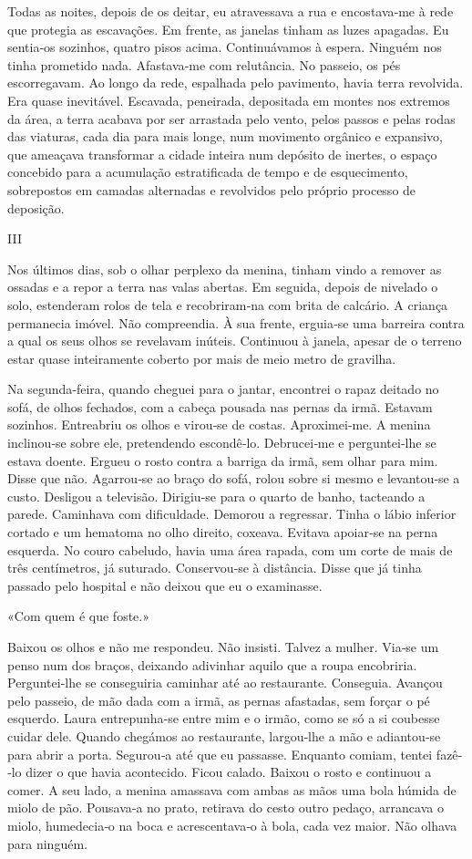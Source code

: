 Todas as noites, depois de os deitar, eu atravessava a rua e
encostava­‑me à rede que protegia as escavações. Em frente, as janelas
tinham as luzes apagadas. Eu sentia­‑os sozinhos, quatro pisos acima.
Continuávamos à espera. Ninguém nos tinha prometido nada. Afastava­‑me
com relutância. No passeio, os pés escorregavam. Ao longo da rede,
espalhada pelo pavimento, havia terra revolvida. Era quase inevitável.
Escavada, peneirada, depositada em montes nos extremos da área, a terra
acabava por ser arrastada pelo vento, pelos passos e pelas rodas das
viaturas, cada dia para mais longe, num movimento orgânico e expansivo,
que ameaçava transformar a cidade inteira num depósito de inertes, o
espaço concebido para a acumulação estratificada de tempo e de
esquecimento, sobrepostos em camadas alternadas e revolvidos pelo
próprio processo de deposição.

III

Nos últimos dias, sob o olhar perplexo da menina, tinham vindo a remover
as ossadas e a repor a terra nas valas abertas. Em seguida, depois de
nivelado o solo, estenderam rolos de tela e recobriram­‑na com brita de
calcário. A criança permanecia imóvel. Não compreendia. À sua frente,
erguia­‑se uma barreira contra a qual os seus olhos se revelavam
inúteis. Continuou à janela, apesar de o terreno estar quase
inteiramente coberto por mais de meio metro de gravilha.

Na segunda­‑feira, quando cheguei para o jantar, encontrei o rapaz
deitado no sofá, de olhos fechados, com a cabeça pousada nas pernas da
irmã. Estavam sozinhos. Entreabriu os olhos e virou­‑se de costas.
Aproximei­‑me. A menina inclinou­‑se sobre ele, pretendendo escondê­‑lo.
Debrucei­‑me e perguntei­‑lhe se estava doente. Ergueu o rosto contra a
barriga da irmã, sem olhar para mim. Disse que não. Agarrou­‑se ao braço
do sofá, rolou sobre si mesmo e levantou­‑se a custo. Desligou a
televisão. Dirigiu­‑se para o quarto de banho, tacteando a parede.
Caminhava com dificuldade. Demorou a regressar. Tinha o lábio inferior
cortado e um hematoma no olho direito, coxeava. Evitava apoiar­‑se na
perna esquerda. No couro cabeludo, havia uma área rapada, com um corte
de mais de três centímetros, já suturado. Conservou­‑se à distância.
Disse que já tinha passado pelo hospital e não deixou que eu o
examinasse.

«Com quem é que foste.»

Baixou os olhos e não me respondeu. Não insisti. Talvez a mulher.
Via­‑se um penso num dos braços, deixando adivinhar aquilo que a roupa
encobriria. Perguntei­‑lhe se conseguiria caminhar até ao restaurante.
Conseguia. Avançou pelo passeio, de mão dada com a irmã, as pernas
afastadas, sem forçar o pé esquerdo. Laura entrepunha­‑se entre mim e o
irmão, como se só a si coubesse cuidar dele. Quando chegámos ao
restaurante, largou­‑lhe a mão e adiantou­‑se para abrir a porta.
Segurou­‑a até que eu passasse. Enquanto comiam, tentei fazê­‑lo dizer o
que havia acontecido. Ficou calado. Baixou o rosto e continuou a comer.
A seu lado, a menina amassava com ambas as mãos uma bola húmida de miolo
de pão. Pousava­‑a no prato, retirava do cesto outro pedaço, arrancava o
miolo, humedecia­‑o na boca e acrescentava­‑o à bola, cada vez maior.
Não olhava para ninguém.

